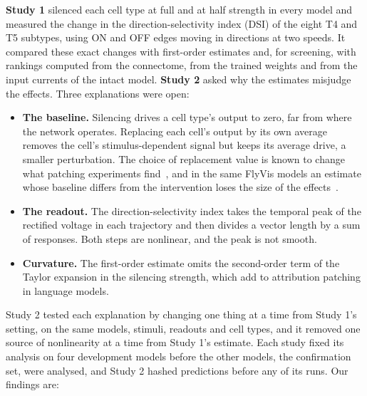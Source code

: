 \textbf{Study 1} silenced each cell type at full and at half strength in every model and measured the change in the direction-selectivity index (DSI) of the eight T4 and T5 subtypes, using ON and OFF edges moving in \NDirections{} directions at two speeds. It compared these exact changes with first-order estimates and, for screening, with rankings computed from the connectome, from the trained weights and from the input currents of the intact model. \textbf{Study 2} asked why the estimates misjudge the effects. Three explanations were open:
\begin{itemize}
  \item \textbf{The baseline.} Silencing drives a cell type's output to zero, far from where the network operates. Replacing each cell's output by its own average removes the cell's stimulus-dependent signal but keeps its average drive, a smaller perturbation. The choice of replacement value is known to change what patching experiments find~\citep{heimersheim2024patching,miller2024metrics}, and in the same FlyVis models an estimate whose baseline differs from the intervention loses the size of the effects~\citep{dhawan2026flyhack}.
  \item \textbf{The readout.} The direction-selectivity index takes the temporal peak of the rectified voltage in each trajectory and then divides a vector length by a sum of responses. Both steps are nonlinear, and the peak is not smooth.
  \item \textbf{Curvature.} The first-order estimate omits the second-order term of the Taylor expansion in the silencing strength, which \citet{zhang2026attribution} add to attribution patching in language models.
\end{itemize}
Study 2 tested each explanation by changing one thing at a time from Study 1's setting, on the same models, stimuli, readouts and cell types, and it removed one source of nonlinearity at a time from Study 1's estimate. Each study fixed its analysis on four development models before the other \NConfModels{} models, the confirmation set, were analysed, and Study 2 hashed \PredPrimaryTotal{} predictions before any of its runs. Our findings are:
